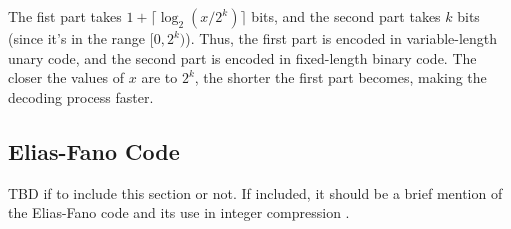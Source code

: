 \noindent The fist part takes $1 + \lceil\log_2(x/2^k)\rceil$ bits, and the second part takes $k$ bits (since it's in the range $[0,2^k)$). Thus, the first part is encoded in variable-length unary code, and the second part is encoded in fixed-length binary code. The closer the values of $x$ are to $2^k$, the shorter the first part becomes, making the decoding process faster.




\subsection{Elias-Fano Code}
TBD if to include this section or not. If included, it should be a brief mention of the Elias-Fano code and its use in integer compression \cite{ferragina2023pearls}.
